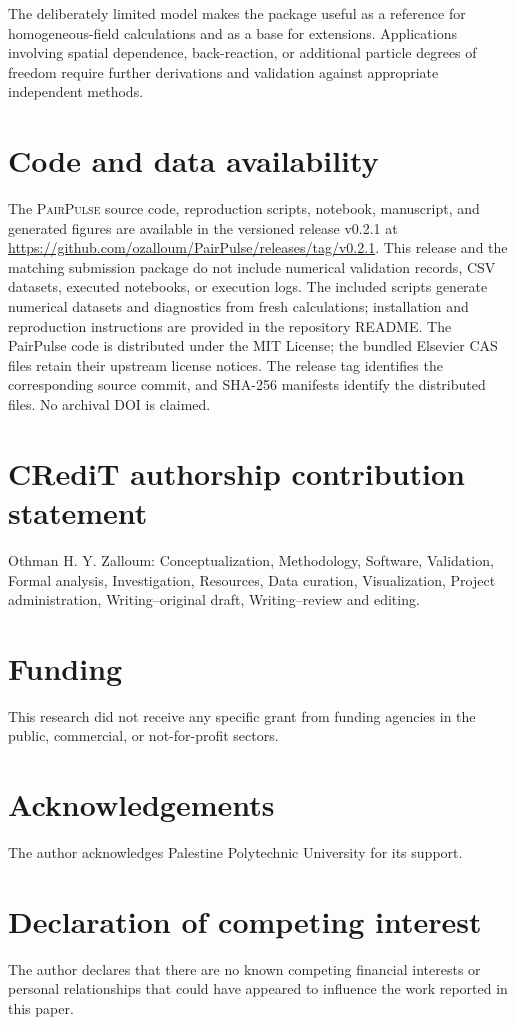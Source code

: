 \documentclass[a4paper,fleqn]{cas-dc}
\newcommand{\PairPulse}{\textsc{PairPulse}}
\begin{document}
The deliberately limited model makes the package useful as a reference for homogeneous-field calculations and as a base for extensions. Applications involving spatial dependence, back-reaction, or additional particle degrees of freedom require further derivations and validation against appropriate independent methods.

\section*{Code and data availability}
The \PairPulse{} source code, reproduction scripts, notebook, manuscript, and generated figures are available in the versioned release v0.2.1 at \url{https://github.com/ozalloum/PairPulse/releases/tag/v0.2.1}. This release and the matching submission package do not include numerical validation records, CSV datasets, executed notebooks, or execution logs. The included scripts generate numerical datasets and diagnostics from fresh calculations; installation and reproduction instructions are provided in the repository README. The PairPulse code is distributed under the MIT License; the bundled Elsevier CAS files retain their upstream license notices. The release tag identifies the corresponding source commit, and SHA-256 manifests identify the distributed files. No archival DOI is claimed.

\section*{CRediT authorship contribution statement}
Othman H. Y. Zalloum: Conceptualization, Methodology, Software, Validation, Formal analysis, Investigation, Resources, Data curation, Visualization, Project administration, Writing--original draft, Writing--review and editing.

\section*{Funding}
This research did not receive any specific grant from funding agencies in the public, commercial, or not-for-profit sectors.

\section*{Acknowledgements}
The author acknowledges Palestine Polytechnic University for its support.

\section*{Declaration of competing interest}
The author declares that there are no known competing financial interests or personal relationships that could have appeared to influence the work reported in this paper.
\end{document}
